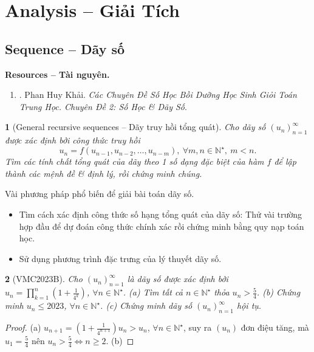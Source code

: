 \documentclass{article}
\newtheorem{baitoan}{}
\begin{document}

\section{Analysis -- Giải Tích}

\subsection{Sequence -- Dãy số}
\textbf{\textsf{Resources -- Tài nguyên.}}
\begin{enumerate}
	\item \cite{Khai_so_hoc_day_so}. {\sc Phan Huy Khải}. {\it Các Chuyên Đề Số Học Bồi Dưỡng Học Sinh Giỏi Toán Trung Học. Chuyên Đề 2: Số Học \& Dãy Số}.
\end{enumerate}

\begin{baitoan}[General recursive sequences -- Dãy truy hồi tổng quát]
	Cho dãy số $(u_n)_{n=1}^\infty$ được xác định bởi công thức truy hồi
	\begin{equation}
		\boxed{u_n = f(u_{n-1},u_{n-2},\ldots,u_{n-m}),\ \forall m,n\in\mathbb{N}^\star,\ m < n.}
	\end{equation}
	Tìm các tính chất tổng quát của dãy theo 1 số dạng đặc biệt của hàm $f$ để lập thành các mệnh đề \& định lý, rồi chứng minh chúng.
\end{baitoan}
{\sf Vài phương pháp phổ biến để giải bài toán dãy số.}
\begin{itemize}
	\item Tìm cách xác định công thức số hạng tổng quát của dãy số: Thử vài trường hợp đầu để dự đoán công thức chính xác rồi chứng minh bằng quy nạp toán học.
	\item Sử dụng phương trình đặc trưng của lý thuyết dãy số.
\end{itemize}

\begin{baitoan}[VMC2023B]
	Cho $(u_n)_{n=1}^\infty$ là dãy số được xác định bởi $u_n = \prod_{k=1}^n \left(1 + \frac{1}{4^k}\right)$, $\forall n\in\mathbb{N}^\star$. (a) Tìm tất cả $n\in\mathbb{N}^\star$ thỏa $u_n > \frac{5}{4}$. (b) Chứng minh $u_n\le2023$, $\forall n\in\mathbb{N}^\star$. (c) Chứng minh dãy số $(u_n)_{n=1}^\infty$ hội tụ.
\end{baitoan}

\begin{proof}
	(a) $u_{n+1} = \left(1 + \frac{1}{4^{n+1}}\right)u_n > u_n$, $\forall n\in\mathbb{N}^\star$, suy ra $(u_n)$ đơn điệu tăng, mà $u_1 = \frac{5}{4}$ nên $u_n > \frac{5}{4}\Leftrightarrow n\ge2$. (b)
\end{proof}
\end{document}
